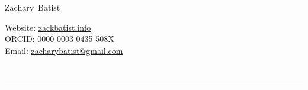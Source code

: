 \documentclass[11pt, a4paper]{article}
\makeatletter
\newcommand{\FirstName}{Zachary}
\newcommand{\LastName}{Batist}
\newcommand{\MyName}{\FirstName\ \LastName}
\newcommand{\Email}{zacharybatist@gmail.com}
\newcommand{\PersonalWebsite}{zackbatist.info}
\newcommand{\MyGitHub}{zackbatist}
\newcommand{\Twitter}{@mtl\_zack}
\newcommand{\Mastodon}{archaeo.social/@zackbatist}
\newcommand{\ORCID}{0000-0003-0435-508X}
\newcommand{\Duration}[2]{\fontsize{10pt}{0}\selectfont #1 -- #2}
\newcommand{\Ongoing}{present}
\newcommand{\Appointment}[4]{\textbf{#1} \newline #2 \newline #3 \newline #4}
\makeatother
\begin{document}
\thispagestyle{empty}

{\fontsize{22pt}{0}\selectfont\MyName}\\[-1.5cm]
\begin{minipage}[t]{1\textwidth}
  \begin{flushright}
    Website: \href{https://\PersonalWebsite}{\PersonalWebsite}\\
    ORCID: \href{https://orcid.org/\ORCID}{\ORCID}\\
    Email: \href{mailto:\Email}{\Email}
  \end{flushright}
\end{minipage}\\[0.1cm]
\rule{\textwidth}{0.2pt}\\[-1cm]



\end{document}
